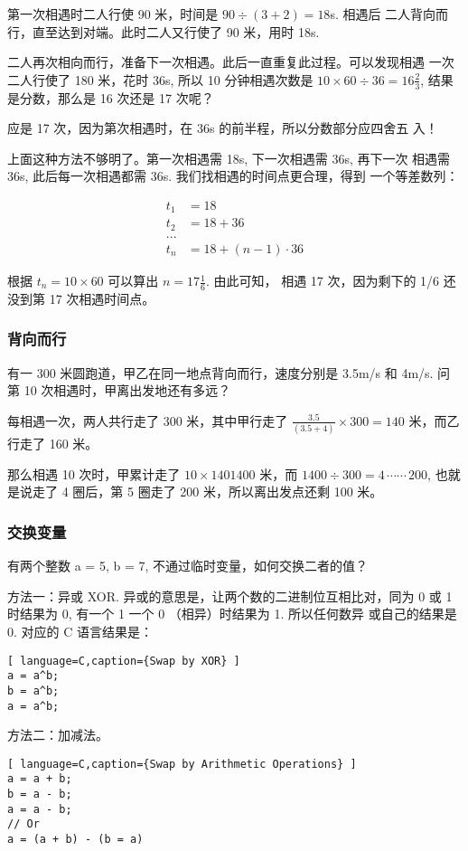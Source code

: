 第一次相遇时二人行使 90 米，时间是 $90 \div (3 + 2) = 18$s. 相遇后
二人背向而行，直至达到对端。此时二人又行使了 90 米，用时 18s.

二人再次相向而行，准备下一次相遇。此后一直重复此过程。可以发现相遇
一次二人行使了 180 米，花时 36s, 所以 10 分钟相遇次数是 $10 \times
60 \div 36 = 16\frac{2}{3}$, 结果是分数，那么是 16 次还是 17 次呢？

应是 17 次，因为第次相遇时，在 36s 的前半程，所以分数部分应四舍五
入！

上面这种方法不够明了。第一次相遇需 18s, 下一次相遇需 36s, 再下一次
相遇需 36s, 此后每一次相遇都需 36s. 我们找相遇的时间点更合理，得到
一个等差数列：

\[
  \begin{aligned}
    t_1 &= 18 \\
    t_2 &= 18 + 36 \\
    ... \\
    t_n &= 18 + (n - 1) \cdot 36
  \end{aligned}
\]

根据 $t_n = 10 \times 60$ 可以算出 $n = 17\frac{1}{6}$. 由此可知，
相遇 17 次，因为剩下的 1/6 还没到第 17 次相遇时间点。

\subsubsection{背向而行}

有一 300 米圆跑道，甲乙在同一地点背向而行，速度分别是 3.5m/s 和
4m/s. 问第 10 次相遇时，甲离出发地还有多远？

每相遇一次，两人共行走了 300 米，其中甲行走了 $\frac{3.5}{(3.5 +
  4)} \times 300 = 140$ 米，而乙行走了 160 米。

那么相遇 10 次时，甲累计走了 $10 \times 140 1400$ 米，而 $1400
\div 300 = 4\, \cdots \cdots\, 200$, 也就是说走了 4 圈后，第 5 圈走了
200 米，所以离出发点还剩 100 米。

\subsubsection{交换变量}

有两个整数 a = 5, b = 7, 不通过临时变量，如何交换二者的值？

方法一：异或 XOR. 异或的意思是，让两个数的二进制位互相比对，同为 0
或 1 时结果为 0, 有一个 1 一个 0 （相异）时结果为 1. 所以任何数异
或自己的结果是 0. 对应的 C 语言结果是：

\begin{lstlisting}[ language=C,caption={Swap by XOR} ]
a = a^b;
b = a^b;
a = a^b;
\end{lstlisting}

方法二：加减法。

\begin{lstlisting}[ language=C,caption={Swap by Arithmetic Operations} ]
a = a + b;
b = a - b;
a = a - b;
// Or
a = (a + b) - (b = a)
\end{lstlisting}

